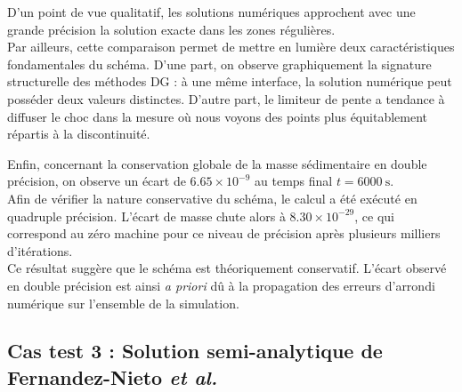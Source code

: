 \documentclass[11pt, a4paper, oneside]{report}
\begin{document}
D'un point de vue qualitatif, les solutions numériques approchent avec une grande précision la solution exacte dans les zones régulières. \\
Par ailleurs, cette comparaison permet de mettre en lumière deux caractéristiques fondamentales du schéma. D'une part, on observe graphiquement la signature structurelle des méthodes DG : à une même interface, la solution numérique peut posséder deux valeurs distinctes.
D'autre part, le limiteur de pente a tendance à diffuser le choc dans la mesure où nous voyons des points plus équitablement répartis à la discontinuité.

Enfin, concernant la conservation globale de la masse sédimentaire en double précision, on observe un écart de $6.65 \times 10^{-9}$ au temps final $t = \SI{6000}{\second}$. \\
Afin de vérifier la nature conservative du schéma, le calcul a été exécuté en quadruple précision. L'écart de masse chute alors à $8.30 \times 10^{-29}$, ce qui correspond au zéro machine pour ce niveau de précision après plusieurs milliers d'itérations. \\
Ce résultat suggère que le schéma est théoriquement conservatif. L'écart observé en double précision est ainsi \textit{a priori} dû à la propagation des erreurs d'arrondi numérique sur l'ensemble de la simulation.

\subsection{Cas test 3 : Solution semi-analytique de Fernandez-Nieto \textit{et al.}} \label{sec:Cas_test_2_4}
\end{document}
